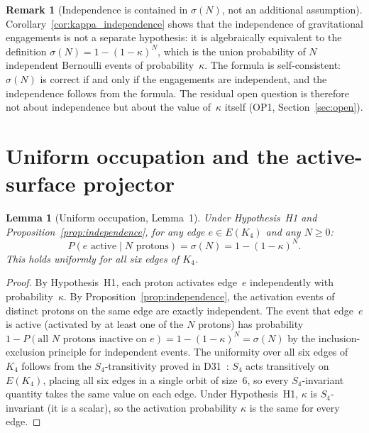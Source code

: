 \documentclass[11pt,a4paper]{article}
\newtheorem{lemma}[theorem]{Lemma}
\theoremstyle{definition}
\newtheorem{remark}[theorem]{Remark}
\newcommand{\sig}{\sigma}
\newcommand{\kap}{\kappa}
\newcommand{\Kfour}{K_4}
\begin{document}
\begin{remark}[Independence is contained in $\sigma(N)$, not an additional assumption]
\label{rem:independence_in_sigma}
Corollary~\ref{cor:kappa_independence} shows that the independence of gravitational engagements is not a separate hypothesis: it is algebraically equivalent to the definition $\sig(N) = 1-(1-\kap)^N$, which is the union probability of $N$ independent Bernoulli events of probability~$\kap$. The formula is self-consistent: $\sig(N)$ is correct if and only if the engagements are independent, and the independence follows from the formula. The residual open question is therefore not about independence but about the value of~$\kap$ itself (OP1, Section~\ref{sec:open}).
\end{remark}

\section{Uniform occupation and the active-surface projector}
\label{sec:occupation}

\begin{lemma}[Uniform occupation, Lemma~1]
\label{lem:occupation}
Under Hypothesis~H1 and Proposition~\ref{prop:independence}, for any edge $e\in E(\Kfour)$ and any $N\geq 0$:
\begin{equation}
P(e \text{ active} \mid N \text{ protons}) = \sig(N) = 1-(1-\kap)^N. \label{eq:occupation}
\end{equation}
This holds uniformly for all six edges of $\Kfour$.
\end{lemma}

\begin{proof}
By Hypothesis~H1, each proton activates edge~$e$ independently with probability~$\kap$. By Proposition~\ref{prop:independence}, the activation events of distinct protons on the same edge are exactly independent. The event that edge~$e$ is active (activated by at least one of the $N$ protons) has probability $1 - P(\text{all $N$ protons inactive on $e$}) = 1-(1-\kap)^N = \sig(N)$ by the inclusion-exclusion principle for independent events. The uniformity over all six edges of $\Kfour$ follows from the $S_4$-transitivity proved in D31~\cite{PDL_D31_2026}: $S_4$ acts transitively on $E(\Kfour)$, placing all six edges in a single orbit of size~6, so every $S_4$-invariant quantity takes the same value on each edge. Under Hypothesis~H1, $\kap$ is $S_4$-invariant (it is a scalar), so the activation probability $\kap$ is the same for every edge.
\end{proof}
\end{document}
